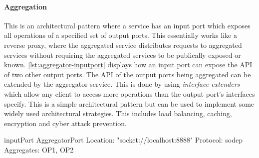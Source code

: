 \paragraph{Aggregation} This is an architectural pattern where a service has an input port which exposes all operations of a specified set of output ports. This essentially works like a reverse proxy, where the aggregated service distributes requests to aggregated services without
requiring the aggregated services to be publically exposed or known. \cref{lst:aggregator-inputport} displays how an input port can expose the API of two other output ports.
The API of the output ports being aggregated can be extended by the aggregator service. This is done by using \emph{interface extenders} which allow any client to access more operations than the output port's interfaces specify.
This is a simple architectural pattern but can be used to implement some widely used architectural strategies. This includes load balancing, caching, encryption and cyber attack prevention.

\begin{jolisting}[][caption={Input port which aggregates requests to some output ports, OP1 and OP2.}, label=lst:aggregator-inputport]
inputPort AggregatorPort {
    Location: "socket://localhost:8888"
    Protocol: sodep
    Aggregates: OP1, OP2
}
\end{jolisting}

